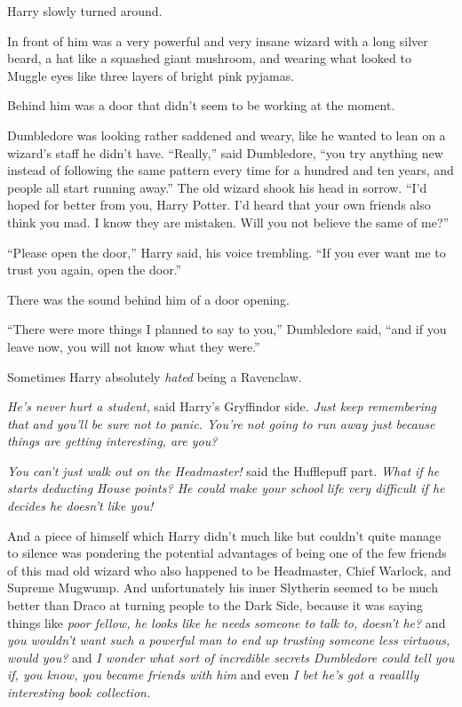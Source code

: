 Harry slowly turned around.

In front of him was a very powerful and very insane wizard with a long silver beard, a hat like a squashed giant mushroom, and wearing what looked to Muggle eyes like three layers of bright pink pyjamas.

Behind him was a door that didn't seem to be working at the moment.

Dumbledore was looking rather saddened and weary, like he wanted to lean on a wizard's staff he didn't have. ``Really,'' said Dumbledore, ``you try anything new instead of following the same pattern every time for a hundred and ten years, and people all start running away.'' The old wizard shook his head in sorrow. ``I'd hoped for better from you, Harry Potter. I'd heard that your own friends also think you mad. I know they are mistaken. Will you not believe the same of me?''

``Please open the door,'' Harry said, his voice trembling. ``If you ever want me to trust you again, open the door.''

There was the sound behind him of a door opening.

``There were more things I planned to say to you,'' Dumbledore said, ``and if you leave now, you will not know what they were.''

Sometimes Harry absolutely \emph{hated} being a Ravenclaw.

\emph{He's never hurt a student,} said Harry's Gryffindor side. \emph{Just keep remembering that and you'll be sure not to panic. You're not going to run away just because things are getting interesting, are you?}

\emph{You can't just walk out on the Headmaster!} said the Hufflepuff part. \emph{What if he starts deducting House points? He could make your school life very difficult if he decides he doesn't like you!}

And a piece of himself which Harry didn't much like but couldn't quite manage to silence was pondering the potential advantages of being one of the few friends of this mad old wizard who also happened to be Headmaster, Chief Warlock, and Supreme Mugwump. And unfortunately his inner Slytherin seemed to be much better than Draco at turning people to the Dark Side, because it was saying things like \emph{poor fellow, he looks like he needs someone to talk to, doesn't he?} and \emph{you wouldn't want such a powerful man to end up trusting someone less virtuous, would you?} and \emph{I wonder what sort of incredible secrets Dumbledore could tell you if, you know, you became friends with him} and even \emph{I bet he's got a reaallly interesting book collection.}

